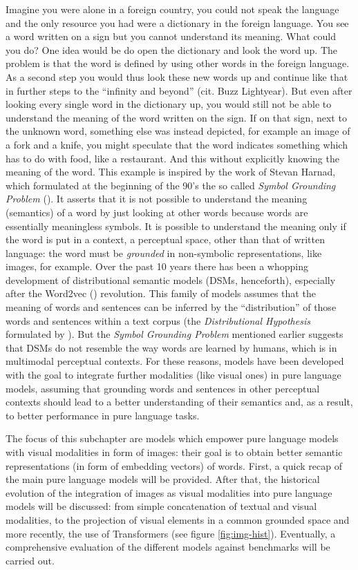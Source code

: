 \documentclass[
]{krantz}
\begin{document}
Imagine you were alone in a foreign country, you could not speak the language and the only resource you had were a dictionary in the foreign language. You see a word written on a sign but you cannot understand its meaning. What could you do? One idea would be do open the dictionary and look the word up. The problem is that the word is defined by using other words in the foreign language. As a second step you would thus look these new words up and continue like that in further steps to the ``infinity and beyond'' (cit. Buzz Lightyear). But even after looking every single word in the dictionary up, you would still not be able to understand the meaning of the word written on the sign. If on that sign, next to the unknown word, something else was instead depicted, for example an image of a fork and a knife, you might speculate that the word indicates something which has to do with food, like a restaurant. And this without explicitly knowing the meaning of the word. This example is inspired by the work of Stevan Harnad, which formulated at the beginning of the 90's the so called \emph{Symbol Grounding Problem} (\citet{harnad1990symbol}). It asserts that it is not possible to understand the meaning (semantics) of a word by just looking at other words because words are essentially meaningless symbols. It is possible to understand the meaning only if the word is put in a context, a perceptual space, other than that of written language: the word must be \emph{grounded} in non-symbolic representations, like images, for example. Over the past 10 years there has been a whopping development of distributional semantic models (DSMs, henceforth), especially after the Word2vec (\citet{mikolov2013efficient}) revolution. This family of models assumes that the meaning of words and sentences can be inferred by the ``distribution'' of those words and sentences within a text corpus (the \emph{Distributional Hypothesis} formulated by \citet{harris1954distributional}). But the \emph{Symbol Grounding Problem} mentioned earlier suggests that DSMs do not resemble the way words are learned by humans, which is in multimodal perceptual contexts. For these reasons, models have been developed with the goal to integrate further modalities (like visual ones) in pure language models, assuming that grounding words and sentences in other perceptual contexts should lead to a better understanding of their semantics and, as a result, to better performance in pure language tasks.

The focus of this subchapter are models which empower pure language models with visual modalities in form of images: their goal is to obtain better semantic representations (in form of embedding vectors) of words. First, a quick recap of the main pure language models will be provided. After that, the historical evolution of the integration of images as visual modalities into pure language models will be discussed: from simple concatenation of textual and visual modalities, to the projection of visual elements in a common grounded space and more recently, the use of Transformers (see figure \ref{fig:img-hist}). Eventually, a comprehensive evaluation of the different models against benchmarks will be carried out.
\end{document}

